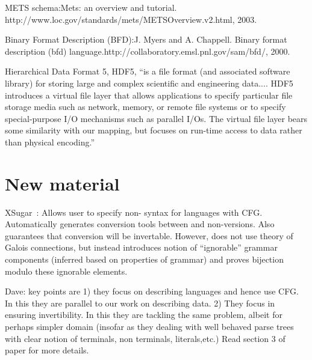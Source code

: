 \documentclass[11pt]{article}
\begin{document}
METS schema:Mets: an overview and
tutorial. http://www.loc.gov/standards/mets/METSOverview.v2.html, 2003.

Binary Format Description (BFD):J. Myers and A. Chappell. Binary
format description (bfd)
language.http://collaboratory.emsl.pnl.gov/sam/bfd/, 2000.

Hierarchical Data Format 5, HDF5, ``is a file format (and associated
software library) for storing large and complex scientific and
engineering data....
HDF5 introduces a virtual file layer that allows applications to
specify particular file storage media such as network, memory, or
remote file systems or to specify special-purpose I/O mechanisms such
as parallel I/Os. The virtual file layer bears some similarity with
our mapping, but focuses on run-time access to data rather than
physical encoding.''

\section{New material}

XSugar~\cite{brabrand+:xsugar2005}: Allows user to specify non-\xml
syntax for \xml languages with CFG. Automatically generates conversion
tools between \xml and non-\xml versions. Also guarantees that
conversion will be invertable. However, does not use theory of Galois
connections, but instead introduces notion of ``ignorable'' grammar
components (inferred based on properties of grammar) and proves
bijection modulo these ignorable elements.

Dave: key points are 1) they focus on describing languages and hence
use CFG. In this they are parallel to our work on describing data. 2)
They focus in ensuring invertibility. In this they are tackling the
same problem, albeit for perhaps simpler domain (insofar as they
dealing with well behaved parse trees with clear notion of terminals,
non terminals, literals,etc.) Read section 3 of paper for more details.
 


{

}
\end{document}
